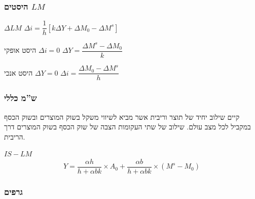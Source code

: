 \documentclass[usenames,dvipsnames]{beamer}
\newcommand{\D}[1]{\Delta #1}
\begin{document}
\begin{RTL}
        \begin{frame}
            \frametitle{היסטים $LM$}
            \begin{alertblock}{$\D{LM}$}
                $\Delta i = \dfrac{1}{h} \left[k\D{Y} + \D{M_0} - \D{M^s}\right]$  
            \end{alertblock}
            
            \begin{block}{ היסט אופקי $\Delta i = 0 $}
                $\D{Y} = \dfrac{\D{M^s} - \D{M_0}}{k}$
            \end{block}

            \begin{block}{ היסט אנכי $\Delta Y = 0 $}
                $\D{i} = \dfrac{\D{M_0} - \D{M^s} }{h}$
            \end{block}

            
        
        \end{frame}
        \begin{frame}
            \frametitle{ש''מ כללי}
            קיים שילוב יחיד של תוצר וריבית אשר מביא לשיווי משקל בשוק המוצרים ובשוק הכסף במקביל לכל מצב
עולם.
שילוב של שתי העקומות הצבה של שוק הכסף בשוק המוצרים דרך הריבית.
\begin{block}{$IS-LM$}
    \begin{equation*}
        Y=\frac{\alpha h}{h+\alpha b k} \times A_0+\frac{\alpha b}{h+\alpha b k} \times\left(M^s-M_0\right)
    \end{equation*}
\end{block}
        
            
        
        \end{frame}

        \begin{frame}[allowframebreaks]
            \frametitle{גרפים}
        

\end{frame}
\end{RTL}
\end{document}

